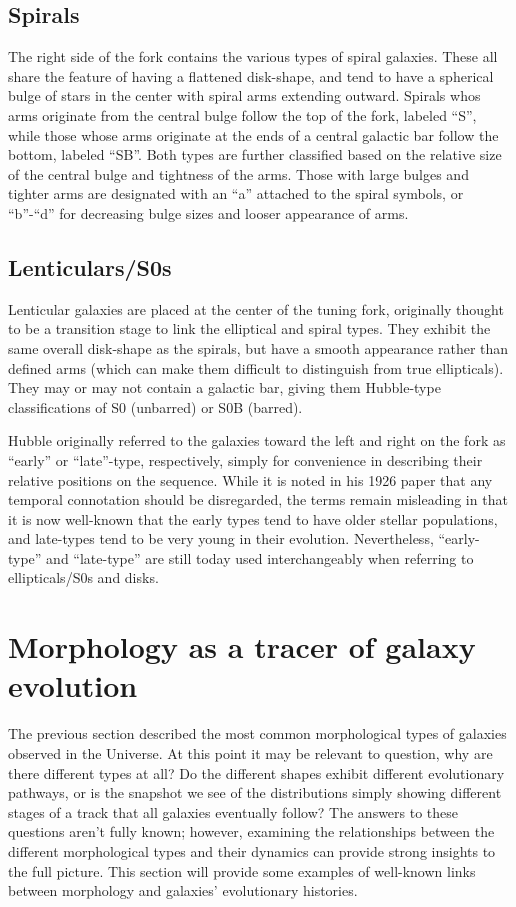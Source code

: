 \subsection{Spirals}

The right side of the fork contains the various types of spiral galaxies. These all share the feature of having a flattened disk-shape, and tend to have a spherical bulge of stars in the center with spiral arms extending outward. Spirals whos arms originate from the central bulge follow the top of the fork, labeled ``S'', while those whose arms originate at the ends of a central galactic bar follow the bottom, labeled ``SB''. Both types are further classified based on the relative size of the central bulge and tightness of the arms. Those with large bulges and tighter arms are designated with an ``a'' attached to the spiral symbols, or ``b''-``d'' for decreasing bulge sizes and looser appearance of arms. 

\subsection{Lenticulars/S0s}

Lenticular galaxies are placed at the center of the tuning fork, originally thought to be a transition stage to link the elliptical and spiral types. They exhibit the same overall disk-shape as the spirals, but have a smooth appearance rather than defined arms (which can make them difficult to distinguish from true ellipticals). They may or may not contain a galactic bar, giving them Hubble-type classifications of S0 (unbarred) or S0B (barred). 


Hubble originally referred to the galaxies toward the left and right on the fork as ``early'' or ``late''-type, respectively, simply for convenience in describing their relative positions on the sequence. While it is noted in his 1926 paper that any temporal connotation should be disregarded, the terms remain misleading in that it is now well-known that the early types tend to have older stellar populations, and late-types tend to be very young in their evolution. Nevertheless, ``early-type'' and ``late-type'' are still today used interchangeably when referring to ellipticals/S0s and disks. 

\section{Morphology as a tracer of galaxy evolution}

The previous section described the most common morphological types of galaxies observed in the Universe. At this point it may be relevant to question, why are there different types at all? Do the different shapes exhibit different evolutionary pathways, or is the snapshot we see of the distributions simply showing different stages of a track that all galaxies eventually follow? The answers to these questions aren't fully known; however, examining the relationships between the different morphological types and their dynamics can provide strong insights to the full picture. This section will provide some examples of well-known links between morphology and galaxies' evolutionary histories.

